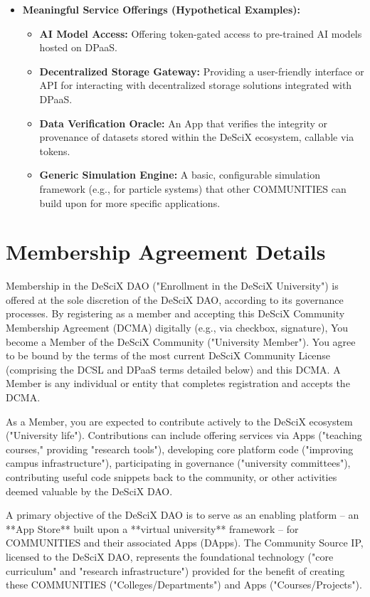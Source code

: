 \documentclass{article}
\begin{document}
\begin{itemize}
    \item \textbf{Meaningful Service Offerings (Hypothetical Examples):}
    \begin{itemize}
        \item \textbf{AI Model Access:} Offering token-gated access to pre-trained AI models hosted on DPaaS.
        \item \textbf{Decentralized Storage Gateway:} Providing a user-friendly interface or API for interacting with decentralized storage solutions integrated with DPaaS.
        \item \textbf{Data Verification Oracle:} An App that verifies the integrity or provenance of datasets stored within the DeSciX ecosystem, callable via tokens.
        \item \textbf{Generic Simulation Engine:} A basic, configurable simulation framework (e.g., for particle systems) that other COMMUNITIES can build upon for more specific applications.
    \end{itemize}
\end{itemize}

\section{Membership Agreement Details} \label{sec:membership}

Membership in the DeSciX DAO ("Enrollment in the DeSciX University") is offered at the sole discretion of the DeSciX DAO, according to its governance processes. By registering as a member and accepting this DeSciX Community Membership Agreement (DCMA) digitally (e.g., via checkbox, signature), You become a Member of the DeSciX Community ("University Member"). You agree to be bound by the terms of the most current DeSciX Community License (comprising the DCSL and DPaaS terms detailed below) and this DCMA. A Member is any individual or entity that completes registration and accepts the DCMA.

As a Member, you are expected to contribute actively to the DeSciX ecosystem ("University life"). Contributions can include offering services via Apps ("teaching courses," providing "research tools"), developing core platform code ("improving campus infrastructure"), participating in governance ("university committees"), contributing useful code snippets back to the community, or other activities deemed valuable by the DeSciX DAO.

A primary objective of the DeSciX DAO is to serve as an enabling platform – an **App Store** built upon a **virtual university** framework – for COMMUNITIES and their associated Apps (DApps). The Community Source IP, licensed to the DeSciX DAO, represents the foundational technology ("core curriculum" and "research infrastructure") provided for the benefit of creating these COMMUNITIES ("Colleges/Departments") and Apps ("Courses/Projects").
\end{document}
